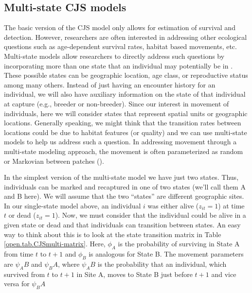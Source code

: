 \subsection{Multi-state CJS models}

The basic version of the CJS model only allows for estimation of survival and detection.  However,
researchers are often interested in addressing other ecological questions such as age-dependent
survival rates, habitat based movements, etc.  Multi-state models allow researchers to directly
address such questions by incorporating more than one state that an individual may potentially
be in \cite{arnason:1972,arnason:1973, brownie_etal:1993}.  These possible states can be geographic
location, age class, or reproductive status among many
others.  Instead of just having an encounter history for an individual, we will also have auxiliary
information on the state of that individual at capture (e.g., breeder or non-breeder).
Since our interest in movement of individuals, here we will consider states that represent spatial units or
geographic locations.  Generally speaking, we might think that the transition rates between locations could be due to
habitat features (or quality) and we can use multi-state models to help us address such a question.
In addressing movement through a multi-state modeling approach, the movement is often parameterized
as random or Markovian between patches (\cite{arnason:1972,arnason:1973, schwarz_etal:1993}).

In the simplest version of the multi-state model we have just two states.  Thus, individuals
can be marked and recaptured in one of two states (we'll call them A and B here).
We will assume that the two ``states'' are different
geographic sites.
In our single-state model above, an individual $i$ was either alive ($z_{it}=1$) at time $t$
or dead ($z_{it}=1$).  Now, we must consider that the individual could be alive in a given state or
dead and that individuals can transition between states.  An easy way to think about this is to look at
the state transition matrix in Table \ref{open.tab.CJSmulti-matrix}.
Here, $\phi_A$ %
is the probability of surviving
in State A from time $t$ to $t+1$ and $\phi_B$ is analogous for State B.  The
movement parameters are $\psi_AB$ and $\psi_BA$,
where $\psi_AB$ is the probability that an individual, which survived
from $t$ to $t+1$ in Site A, moves to State B just
before $t+1$ and vice versa for $\psi_BA$


